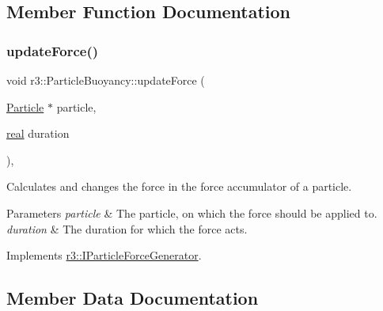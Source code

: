 \subsection{Member Function Documentation}
\mbox{\label{classr3_1_1_particle_buoyancy_ad1249e51508770fd9b1775c8e22eb51a}} 
\subsubsection{\texorpdfstring{update\+Force()}{updateForce()}}
{\footnotesize\ttfamily void r3\+::\+Particle\+Buoyancy\+::update\+Force (\begin{DoxyParamCaption}\item[{\mbox{\hyperlink{classr3_1_1_particle}{Particle}} $\ast$}]{particle,  }\item[{\mbox{\hyperlink{namespacer3_ab2016b3e3f743fb735afce242f0dc1eb}{real}}}]{duration }\end{DoxyParamCaption})\hspace{0.3cm}{\ttfamily [override]}, {\ttfamily [virtual]}}



Calculates and changes the force in the force accumulator of a particle. 


\begin{DoxyParams}{Parameters}
{\em particle} & The particle, on which the force should be applied to. \\
\hline
{\em duration} & The duration for which the force acts. \\
\hline
\end{DoxyParams}


Implements \mbox{\hyperlink{classr3_1_1_i_particle_force_generator_a8b692fc3a40f815dc44c106b451c3a90}{r3\+::\+I\+Particle\+Force\+Generator}}.



\subsection{Member Data Documentation}
\mbox{\label{classr3_1_1_particle_buoyancy_a619b460c0ac8b80c4470f2784f81cc8d}} 
